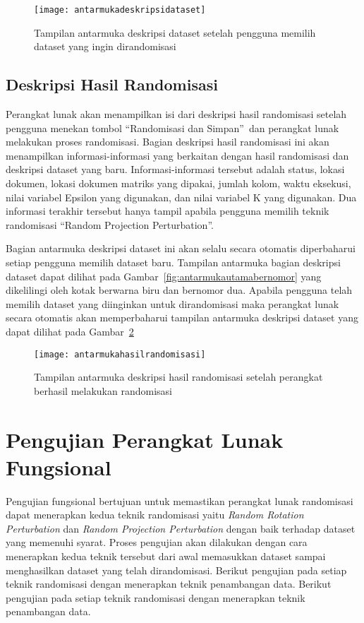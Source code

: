 \begin{figure}
	\centering
	\texttt{[image: antarmukadeskripsidataset]}
	\caption{Tampilan antarmuka deskripsi dataset setelah pengguna memilih dataset yang ingin dirandomisasi}
	\label{fig:antarmukadeskripsidataset}
\end{figure}

\subsection{Deskripsi Hasil Randomisasi}
\label{sec:masukanpengaturan}

Perangkat lunak akan menampilkan isi dari deskripsi hasil randomisasi setelah pengguna menekan tombol \textquotedblleft Randomisasi dan Simpan\textquotedblright~dan perangkat lunak melakukan proses randomisasi. Bagian deskripsi hasil randomisasi ini akan menampilkan informasi-informasi yang berkaitan dengan hasil randomisasi dan deskripsi dataset yang baru. Informasi-informasi tersebut adalah status, lokasi dokumen, lokasi dokumen matriks yang dipakai, jumlah kolom, waktu eksekusi, nilai variabel Epsilon yang digunakan, dan nilai variabel K yang digunakan. Dua informasi terakhir tersebut hanya tampil apabila pengguna memilih teknik randomisasi \textquotedblleft Random Projection Perturbation\textquotedblright.

Bagian antarmuka deskripsi dataset ini akan selalu secara otomatis diperbaharui setiap pengguna memilih dataset baru. Tampilan antarmuka bagian deskripsi dataset dapat dilihat pada Gambar~\ref{fig:antarmukautamabernomor} yang dikelilingi oleh kotak berwarna biru dan bernomor dua. Apabila pengguna telah memilih dataset yang diinginkan untuk dirandomisasi maka perangkat lunak secara otomatis akan memperbaharui tampilan antarmuka deskripsi dataset yang dapat dilihat pada Gambar~\ref{fig:antarmukahasilrandomisasi}

\begin{figure}
	\centering
	\texttt{[image: antarmukahasilrandomisasi]}
	\caption{Tampilan antarmuka deskripsi hasil randomisasi setelah perangkat berhasil melakukan randomisasi}
	\label{fig:antarmukahasilrandomisasi}
\end{figure}

\section{Pengujian Perangkat Lunak Fungsional}
\label{sec:pengujianfungsional}

Pengujian fungsional bertujuan untuk memastikan perangkat lunak randomisasi dapat menerapkan kedua teknik randomisasi yaitu \textit{Random Rotation Perturbation} dan \textit{Random Projection Perturbation} dengan baik terhadap dataset yang memenuhi syarat. Proses pengujian akan dilakukan dengan cara menerapkan kedua teknik tersebut dari awal memasukkan dataset sampai menghasilkan dataset yang telah dirandomisasi. Berikut pengujian pada setiap teknik randomisasi dengan menerapkan teknik penambangan data. Berikut pengujian pada setiap teknik randomisasi dengan menerapkan teknik penambangan data.

